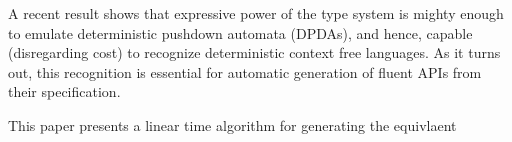 
A recent result shows that expressive power of the \Java type system is mighty
enough to emulate deterministic pushdown automata (DPDAs), and hence, capable
(disregarding cost) to recognize deterministic context free languages. As it
turns out, this recognition is essential for automatic generation of fluent
APIs from their specification. 

This paper presents a linear time algorithm for generating the equivlaent  
